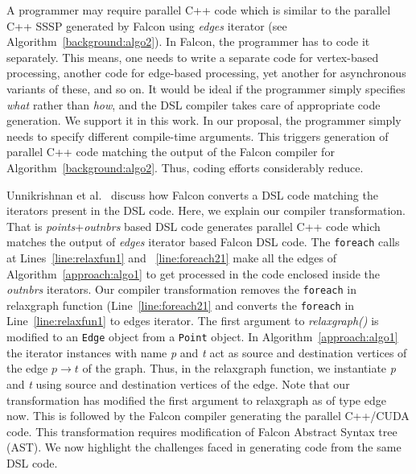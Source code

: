 A programmer may require parallel C++ code which is similar to the parallel C++ SSSP generated by Falcon using {\it edges} iterator (see Algorithm~\ref{background:algo2}). In Falcon, the programmer has to code it separately. 
This means, one needs to write a separate code for vertex-based processing, another code for edge-based processing, yet another for asynchronous variants of these, and so on.
It would be ideal if the programmer simply specifies \textit{what} rather than \textit{how}, and the DSL compiler takes care of appropriate code generation.
We support it in this work.
In our proposal, the programmer simply needs to specify different compile-time arguments. 
This triggers generation of parallel C++ code  matching the output of the Falcon compiler for Algorithm~\ref{background:algo2}. Thus, coding efforts considerably reduce.

Unnikrishnan et al.~\cite{falcon} discuss how Falcon converts a DSL code matching the iterators present in the DSL code. Here, we explain our compiler transformation. That is  {\it points}+{\it outnbrs} based DSL code generates parallel C++ code which matches the output of {\it edges} iterator  based Falcon DSL code.
The \texttt{foreach} calls at Lines~\ref{line:relaxfun1} and ~\ref{line:foreach21} make all the edges of Algorithm~\ref{approach:algo1} to get processed in the code enclosed inside the {\it outnbrs} iterators.
 Our compiler transformation removes the {\tt foreach} in relaxgraph function (Line~\ref{line:foreach21} and converts the \texttt{foreach} in Line~\ref{line:relaxfun1} to edges iterator. The first argument to {\it relaxgraph()} is modified to an  {\tt Edge} object from a {\tt Point} object.
 In Algorithm~\ref{approach:algo1} the iterator instances with name  {\it p} and
 {\it t}
 act as source and destination vertices of the edge $p\rightarrow t$ of the graph. 
Thus, in the relaxgraph function, we instantiate {\it p} and {\it t} using source and destination vertices of the edge. Note that our transformation has modified the first argument to relaxgraph as of type edge now. 
This is followed by the Falcon compiler generating the parallel C++/CUDA code.
This transformation requires modification of Falcon Abstract Syntax tree (AST).
We now highlight the challenges faced in generating code from the same DSL code.

